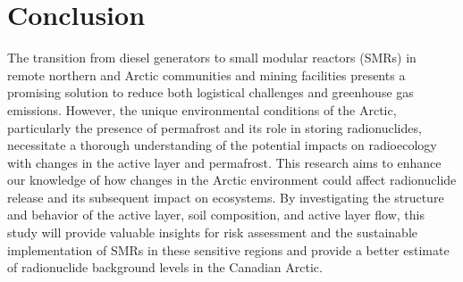 \chapter{Conclusion}
The transition from diesel generators to small modular reactors (SMRs) in remote northern and Arctic communities and mining facilities presents a promising solution to reduce both logistical challenges and greenhouse gas emissions. 
However, the unique environmental conditions of the Arctic, particularly the presence of permafrost and its role in storing radionuclides, necessitate a thorough understanding of the potential impacts on radioecology with changes in the active layer and permafrost. 
This research aims to enhance our knowledge of how changes in the Arctic environment could affect radionuclide release and its subsequent impact on ecosystems. 
By investigating the structure and behavior of the active layer, soil composition, and active layer flow, this study will provide valuable insights for risk assessment and the sustainable implementation of SMRs in these sensitive regions and provide a better estimate of radionuclide background levels in the Canadian Arctic.
